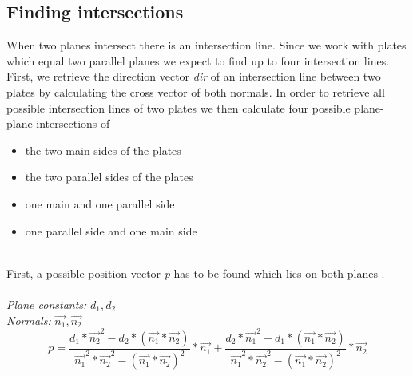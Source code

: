 \documentclass[../ClassicThesis.tex]{subfiles}
\begin{document}
\subsection{Finding intersections}\label{findIntersections}
When two planes intersect there is an intersection line. Since we work with plates which equal two parallel planes we expect to find up to four intersection lines.\\
First, we retrieve the direction vector \emph{dir} of an intersection line between two plates by calculating the cross vector of both normals. In order to retrieve all possible intersection lines of two plates we then calculate four possible plane-plane intersections of 
\begin{itemize}
\item the two main sides of the plates
\item the two parallel sides of the plates
\item one main and one parallel side 
\item one parallel side and one main side
\end{itemize}
\*\\
First, a possible position vector \emph{p} has to be found which lies on both planes \cite{positionVectorRetrieval}.
\\\*\\
\emph{Plane constants:} $d_1, d_2$\\
\emph{Normals:} $\vec{n_1}, \vec{n_2}$
$$ p = \frac{d_1 * \vec{n_{2}}^{2} - d_2 * (\vec{n_1} * \vec{n_2})}{\vec{n_{1}}^{2} * \vec{n_{2}}^{2} - (\vec{n_1} * \vec{n_2})^{2}} * \vec{n_1} + \frac{d_2*\vec{n_1}^2 - d_1*(\vec{n_1} * \vec{n_2})}{\vec{n_1}^2 * \vec{n_2}^2 - (\vec{n_1} * \vec{n_2})^2} * \vec{n_2} $$
\end{document}
